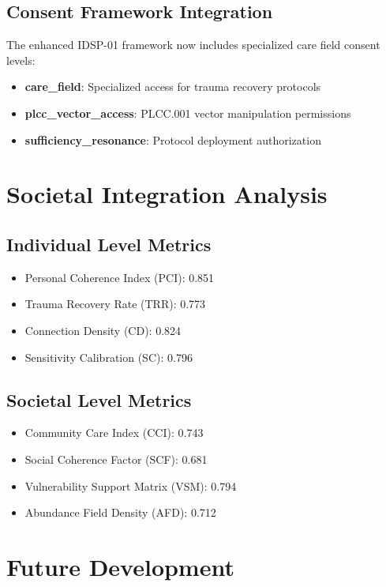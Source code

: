 \documentclass[12pt,a4paper]{article}
\begin{document}
\subsection{Consent Framework Integration}

The enhanced IDSP-01 framework now includes specialized care field consent levels:

\begin{itemize}
    \item \textbf{care\_field}: Specialized access for trauma recovery protocols
    \item \textbf{plcc\_vector\_access}: PLCC.001 vector manipulation permissions
    \item \textbf{sufficiency\_resonance}: Protocol deployment authorization
\end{itemize}

\section{Societal Integration Analysis}

\subsection{Individual Level Metrics}

\begin{itemize}
    \item Personal Coherence Index (PCI): 0.851
    \item Trauma Recovery Rate (TRR): 0.773
    \item Connection Density (CD): 0.824
    \item Sensitivity Calibration (SC): 0.796
\end{itemize}

\subsection{Societal Level Metrics}

\begin{itemize}
    \item Community Care Index (CCI): 0.743
    \item Social Coherence Factor (SCF): 0.681
    \item Vulnerability Support Matrix (VSM): 0.794
    \item Abundance Field Density (AFD): 0.712
\end{itemize}

\section{Future Development}
\end{document}
